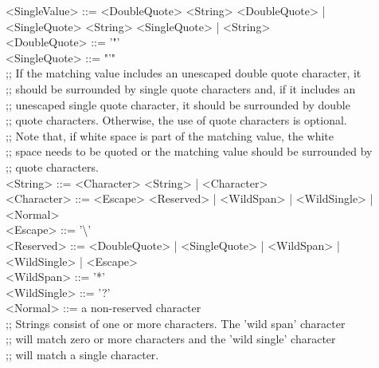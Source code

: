 \settowidth{\utilLen}{<SingleValue> ::= }%
<SingleValue> ::= <DoubleQuote> <String> <DoubleQuote> |\\
\hspace*{\utilLen}<SingleQuote> <String> <SingleQuote> | <String>\\
<DoubleQuote> ::= '"'\\
<SingleQuote> ::= "'"\\
;; If the matching value includes an unescaped double quote character, it\\
;; should be surrounded by single quote characters and, if it includes an\\
;; unescaped single quote character, it should be surrounded by double\\
;; quote characters. Otherwise, the use of quote characters is optional.\\
;; Note that, if white space is part of the matching value, the white\\
;; space needs to be quoted or the matching value should be surrounded by\\
;; quote characters.\\
\newpage
<String> ::= <Character> <String> | <Character>\\
\settowidth{\utilLen}{<Character> ::= }%
<Character> ::= <Escape> <Reserved> | <WildSpan> | <WildSingle> |\\
\hspace*{\utilLen}<Normal>\\
<Escape> ::= '\textbackslash'\\
\settowidth{\utilLen}{<Reserved> ::= }%
<Reserved> ::= <DoubleQuote> | <SingleQuote> | <WildSpan> |\\
\hspace*{\utilLen}<WildSingle> | <Escape>\\
<WildSpan> ::= '*'\\
<WildSingle> ::= '?'\\
<Normal> ::= a non-reserved character\\
;; Strings consist of one or more characters. The 'wild span' character\\
;; will match zero or more characters and the 'wild single' character\\
;; will match a single character.
\outputEnd{}


\appendixEnd{}
